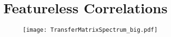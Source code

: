 \section{Featureless Correlations}

\begin{figure}[H]
	\centering
		\texttt{[image: TransferMatrixSpectrum\_big.pdf]}
\end{figure}

